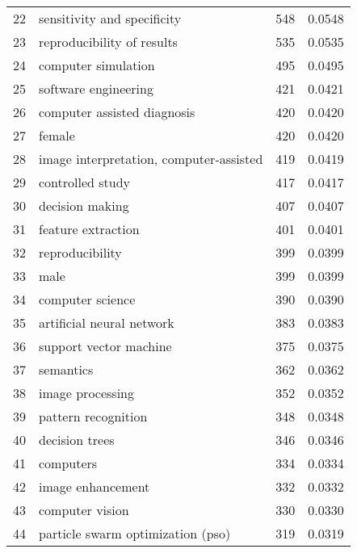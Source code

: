 \begin{tabular}{llrr}
22 &              sensitivity and specificity &         548 &      0.0548 \\
23 &               reproducibility of results &         535 &      0.0535 \\
24 &                      computer simulation &         495 &      0.0495 \\
25 &                     software engineering &         421 &      0.0421 \\
26 &              computer assisted diagnosis &         420 &      0.0420 \\
27 &                                   female &         420 &      0.0420 \\
28 &  image interpretation, computer-assisted &         419 &      0.0419 \\
29 &                         controlled study &         417 &      0.0417 \\
30 &                          decision making &         407 &      0.0407 \\
31 &                       feature extraction &         401 &      0.0401 \\
32 &                          reproducibility &         399 &      0.0399 \\
33 &                                     male &         399 &      0.0399 \\
34 &                         computer science &         390 &      0.0390 \\
35 &                artificial neural network &         383 &      0.0383 \\
36 &                   support vector machine &         375 &      0.0375 \\
37 &                                semantics &         362 &      0.0362 \\
38 &                         image processing &         352 &      0.0352 \\
39 &                      pattern recognition &         348 &      0.0348 \\
40 &                           decision trees &         346 &      0.0346 \\
41 &                                computers &         334 &      0.0334 \\
42 &                        image enhancement &         332 &      0.0332 \\
43 &                          computer vision &         330 &      0.0330 \\
44 &        particle swarm optimization (pso) &         319 &      0.0319 \\

\end{tabular}
